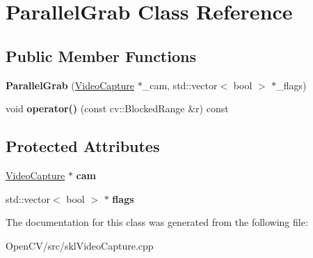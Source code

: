 \hypertarget{class_parallel_grab}{}\section{Parallel\+Grab Class Reference}
\label{class_parallel_grab}
\subsection*{Public Member Functions}
\begin{DoxyCompactItemize}
\item 
\hypertarget{class_parallel_grab_a2f98311acec2fd3b4fc692d3689d2ada}{}\label{class_parallel_grab_a2f98311acec2fd3b4fc692d3689d2ada} 
{\bfseries Parallel\+Grab} (\hyperlink{classskl_1_1_video_capture}{Video\+Capture} $\ast$\+\_\+cam, std\+::vector$<$ bool $>$ $\ast$\+\_\+flags)
\item 
\hypertarget{class_parallel_grab_a5c03e27bad84452850615ab5b31aa005}{}\label{class_parallel_grab_a5c03e27bad84452850615ab5b31aa005} 
void {\bfseries operator()} (const cv\+::\+Blocked\+Range \&r) const
\end{DoxyCompactItemize}
\subsection*{Protected Attributes}
\begin{DoxyCompactItemize}
\item 
\hypertarget{class_parallel_grab_ab74e62057f89cff0b2c227d0923da2f8}{}\label{class_parallel_grab_ab74e62057f89cff0b2c227d0923da2f8} 
\hyperlink{classskl_1_1_video_capture}{Video\+Capture} $\ast$ {\bfseries cam}
\item 
\hypertarget{class_parallel_grab_aba6068c1c02bf4b7c601944bcf2bb1b1}{}\label{class_parallel_grab_aba6068c1c02bf4b7c601944bcf2bb1b1} 
std\+::vector$<$ bool $>$ $\ast$ {\bfseries flags}
\end{DoxyCompactItemize}


The documentation for this class was generated from the following file\+:\begin{DoxyCompactItemize}
\item 
Open\+C\+V/src/skl\+Video\+Capture.\+cpp\end{DoxyCompactItemize}
